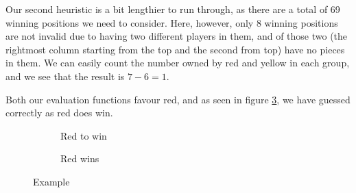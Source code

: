 \documentclass{article}
\newcommand{\rd}{\node [player, fill=red]{};}
\newcommand{\yw}{\node [player, fill=yellow] {};}
\newcommand{\gy}{\node [player, fill=white] {};}
\newcommand{\rt}{\node [threat, fill=red!50] {};}
\newcommand{\yt}{\node [threat, fill=yellow!50] {};}
\begin{document}
Our second heuristic is a bit lengthier to run through, as there are a total of 69 winning positions we need to consider. Here, however, only 8 winning positions are not invalid due to having two different players in them, and of those two (the rightmost column starting from the top and the second from top) have no pieces in them. We can easily count the number owned by red and yellow in each group, and we see that the result is $7-6 = 1$.

Both our evaluation functions favour red, and as seen in figure \ref{fig:win}, we have guessed correctly as red does win.
\begin{figure}[t]
	\centering
	\begin{subfigure}[b]{0.4\textwidth}
		\centering
		\caption{Red to win}
		\label{fig:example}
	\end{subfigure}
	\begin{subfigure}[b]{0.4\textwidth}
		\centering
		\caption{Red wins}
		\label{fig:win}
	\end{subfigure}
	\caption{Example}
\end{figure}
\newpage
\end{document}
